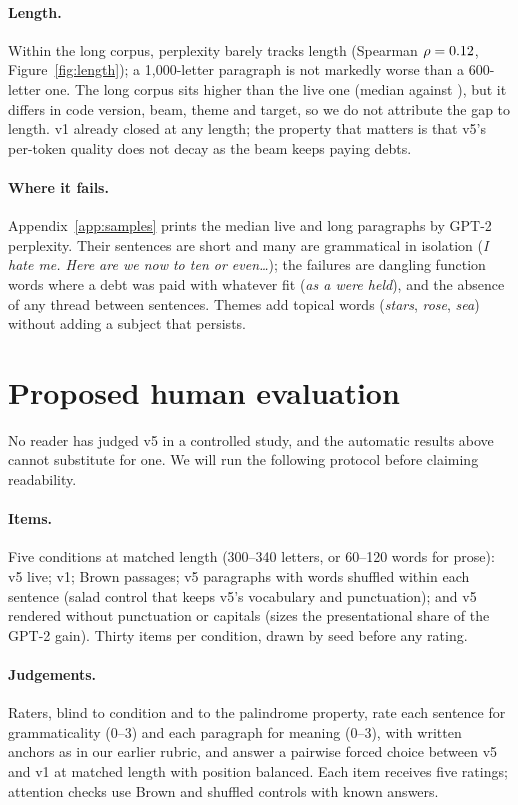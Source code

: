 \documentclass[11pt]{article}
\newcommand{\w}[1]{\emph{#1}}
\begin{document}
\paragraph{Length.} Within the long corpus, perplexity barely tracks length (Spearman $\rho=0.12$, Figure~\ref{fig:length}); a 1,000-letter paragraph is not markedly worse than a 600-letter one. The long corpus sits higher than the live one (median \vFiveSophiaPPL{} against \vFiveLivePPL), but it differs in code version, beam, theme and target, so we do not attribute the gap to length. v1 already closed at any length; the property that matters is that v5's per-token quality does not decay as the beam keeps paying debts.

\paragraph{Where it fails.} Appendix~\ref{app:samples} prints the median live and long paragraphs by GPT-2 perplexity. Their sentences are short and many are grammatical in isolation (\w{I hate me. Here are we now to ten or even\dots}); the failures are dangling function words where a debt was paid with whatever fit (\w{as a were held}), and the absence of any thread between sentences. Themes add topical words (\w{stars}, \w{rose}, \w{sea}) without adding a subject that persists.

\section{Proposed human evaluation}\label{sec:human}

No reader has judged v5 in a controlled study, and the automatic results above cannot substitute for one. We will run the following protocol before claiming readability.

\paragraph{Items.} Five conditions at matched length (300--340 letters, or 60--120 words for prose): v5 live; v1; Brown passages; v5 paragraphs with words shuffled within each sentence (salad control that keeps v5's vocabulary and punctuation); and v5 rendered without punctuation or capitals (sizes the presentational share of the GPT-2 gain). Thirty items per condition, drawn by seed before any rating.

\paragraph{Judgements.} Raters, blind to condition and to the palindrome property, rate each sentence for grammaticality (0--3) and each paragraph for meaning (0--3), with written anchors as in our earlier rubric, and answer a pairwise forced choice between v5 and v1 at matched length with position balanced. Each item receives five ratings; attention checks use Brown and shuffled controls with known answers.
\end{document}
